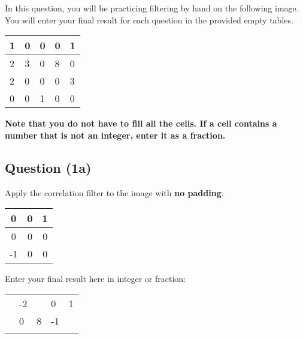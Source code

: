 \documentclass[12pt]{article}
\begin{document}

\noindent In this question, you will be practicing filtering by hand on the following image. You will enter your final result for each question in the provided empty tables.

\begin{center}
\begin{tabular}{|l|l|l|l|l|}
\hline
1 & 0 & 0 & 0 & 1 \\ \hline
2 & 3 & 0 & 8 & 0 \\ \hline
2 & 0 & 0 & 0 & 3 \\ \hline
0 & 0 & 1 & 0 & 0 \\ \hline
\end{tabular}
\end{center}
\textbf{Note that you do not have to fill all the cells. If a cell contains a number that is not an integer, enter it as a fraction.}

\subsection*{Question (1a)} Apply the correlation filter to the image with \textbf{no padding}.
\begin{center}
\begin{tabular}{|c|c|c|}
\hline
0  & 0 & 1 \\ \hline
0  & 0 & 0 \\ \hline
-1 & 0 & 0 \\ \hline
\end{tabular}
\end{center}

\noindent Enter your final result here in integer or fraction:

\begin{center}
\begin{tabular}{|l|l|l|l|l|}
\hline
\hspace{1mm} & \hspace{1mm} & \hspace{1mm} & \hspace{1mm} & \hspace{1mm} \\ \hline
\hspace{1mm} & -2 & \hspace{1mm} & 0 & 1 \\ \hline
\hspace{1mm} & 0 & 8 & -1 & \hspace{1mm} \\ \hline
\hspace{1mm} & \hspace{1mm} & \hspace{1mm} & \hspace{1mm} & \hspace{1mm} \\ \hline
\end{tabular}
\end{center}
\end{document}
